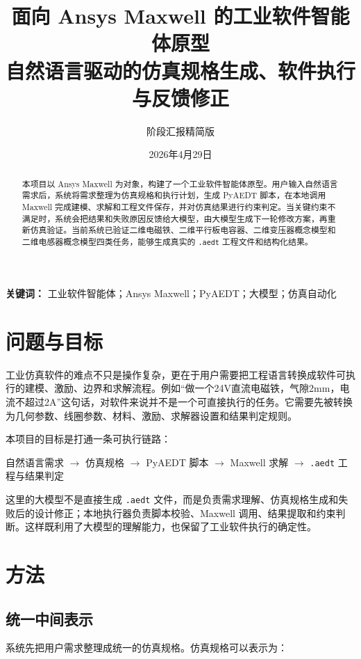 \documentclass[11pt,a4paper]{ctexart}
\title{\textbf{面向 Ansys Maxwell 的工业软件智能体原型}\\
\large 自然语言驱动的仿真规格生成、软件执行与反馈修正}
\author{阶段汇报精简版}
\date{2026年4月29日}
\begin{document}
\maketitle

\begin{abstract}
本项目以 Ansys Maxwell 为对象，构建了一个工业软件智能体原型。用户输入自然语言需求后，系统将需求整理为仿真规格和执行计划，生成 PyAEDT 脚本，在本地调用 Maxwell 完成建模、求解和工程文件保存，并对仿真结果进行约束判定。当关键约束不满足时，系统会把结果和失败原因反馈给大模型，由大模型生成下一轮修改方案，再重新仿真验证。当前系统已验证二维电磁铁、二维平行板电容器、二维变压器概念模型和二维电感器概念模型四类任务，能够生成真实的 \texttt{.aedt} 工程文件和结构化结果。
\end{abstract}

\noindent\textbf{关键词：} 工业软件智能体；Ansys Maxwell；PyAEDT；大模型；仿真自动化

\section{问题与目标}

工业仿真软件的难点不只是操作复杂，更在于用户需要把工程语言转换成软件可执行的建模、激励、边界和求解流程。例如“做一个24V直流电磁铁，气隙2mm，电流不超过2A”这句话，对软件来说并不是一个可直接执行的任务。它需要先被转换为几何参数、线圈参数、材料、激励、求解器设置和结果判定规则。

本项目的目标是打通一条可执行链路：

\begin{center}
自然语言需求 $\rightarrow$ 仿真规格 $\rightarrow$ PyAEDT 脚本 $\rightarrow$ Maxwell 求解 $\rightarrow$ \texttt{.aedt} 工程与结果判定
\end{center}

这里的大模型不是直接生成 \texttt{.aedt} 文件，而是负责需求理解、仿真规格生成和失败后的设计修正；本地执行器负责脚本校验、Maxwell 调用、结果提取和约束判断。这样既利用了大模型的理解能力，也保留了工业软件执行的确定性。

\section{方法}

\subsection{统一中间表示}

系统先把用户需求整理成统一的仿真规格。仿真规格可以表示为：
\end{document}
